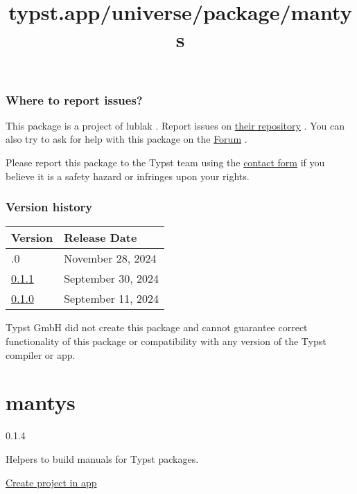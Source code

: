 \subsubsection{Where to report issues?}\label{where-to-report-issues}

This package is a project of lublak . Report issues on
\href{https://github.com/lublak/typst-ctxjs-package}{their repository} .
You can also try to ask for help with this package on the
\href{https://forum.typst.app}{Forum} .

Please report this package to the Typst team using the
\href{https://typst.app/contact}{contact form} if you believe it is a
safety hazard or infringes upon your rights.

\label{versions}
\subsubsection{Version history}\label{version-history}

\begin{longtable}[]{@{}ll@{}}
\toprule\noalign{}
Version & Release Date \\
\midrule\noalign{}
\endhead
\bottomrule\noalign{}
\endlastfoot
0.2.0 & November 28, 2024 \\
\href{https://typst.app/universe/package/ctxjs/0.1.1/}{0.1.1} &
September 30, 2024 \\
\href{https://typst.app/universe/package/ctxjs/0.1.0/}{0.1.0} &
September 11, 2024 \\
\end{longtable}

Typst GmbH did not create this package and cannot guarantee correct
functionality of this package or compatibility with any version of the
Typst compiler or app.


\title{typst.app/universe/package/mantys}

\label{banner}
\label{template-thumbnail}

\section{mantys}\label{mantys}

{ 0.1.4 }

Helpers to build manuals for Typst packages.

\href{/app?template=mantys&version=0.1.4}{Create project in app}

